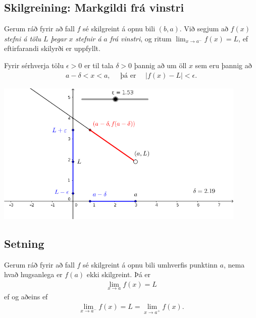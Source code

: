 \documentclass[b5paper,11pt,icelandic]{sphinxmanual}
\begin{document}
\subsection{Skilgreining: Markgildi frá vinstri}
\label{kafli02:skilgreining-markgildi-fra-vinstri}
Gerum ráð fyrir að fall \(f\) sé skilgreint á opnu bili
\((b,a)\). Við segjum að \(f(x)\) \emph{stefni á tölu} \(L\)
\emph{þegar} \(x\) \emph{stefnir á} \(a\) \emph{frá vinstri}, og ritum
\(\lim_{x\rightarrow a^-} f(x)=L\), ef eftirfarandi skilyrði er
uppfyllt.

Fyrir sérhverja tölu \(\epsilon>0\) er til tala \(\delta>0\)
þannig að um öll \(x\) sem eru þannig að
\begin{equation*}
\begin{split}a-\delta<x<a,\quad \text{ þá er } \quad |f(x)-L| <\epsilon.\end{split}
\end{equation*}

\begin{center}
\includegraphics[width=12cm,keepaspectratio=true]{03_markfravinstri.png}
\end{center}



\subsection{Setning}
\label{kafli02:setning-hv-markgildi}\label{kafli02:setning}
Gerum ráð fyrir að fall \(f\) sé skilgreint á opnu bili umhverfis
punktinn \(a\), nema hvað hugsanlega er \(f(a)\) ekki
skilgreint. Þá er
\begin{equation*}
\begin{split}\lim_{x\rightarrow a} f(x)=L\end{split}
\end{equation*}
ef og aðeins ef
\begin{equation*}
\begin{split}\lim_{x\rightarrow a^-} f(x)=L=\lim_{x\rightarrow a^+} f(x).\end{split}
\end{equation*}
\end{document}
